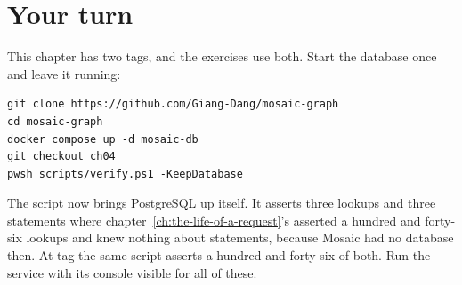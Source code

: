\section*{Your turn}

This chapter has two tags, and the exercises use both. Start the database once
and leave it running:

\begin{verbatim}
git clone https://github.com/Giang-Dang/mosaic-graph
cd mosaic-graph
docker compose up -d mosaic-db
git checkout ch04
pwsh scripts/verify.ps1 -KeepDatabase
\end{verbatim}

The script now brings PostgreSQL up itself. It asserts three lookups and three
statements where chapter~\ref{ch:the-life-of-a-request}'s asserted a hundred and
forty-six lookups and knew nothing about statements, because Mosaic had no
database then. At tag  the same script asserts a hundred and
forty-six of both. Run the service with its console visible for all of these.

